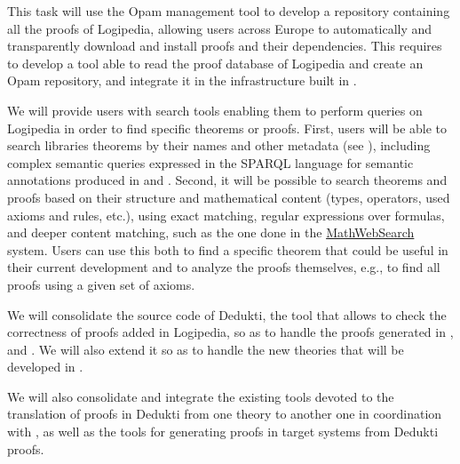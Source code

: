 \begin{workpackage}[id=access,type=RTD,wphases=1-48,
  short=Access,%
  title={Access},
  lead=Inr,InrRM=48,OcaRM=6,EduRM=12]
\begin{tasklist}
\begin{task}[id=opam,
      title=Giving access to the infrastructure in proof systems,
      lead=Oca,OcaRM=6,wphases=15-24]
    This task will use the Opam management tool to develop a
    repository containing all the proofs of Logipedia, allowing users
    across Europe to automatically and transparently download and
    install proofs and their dependencies. This
    requires to develop a tool able to read the proof
    database of Logipedia and create an Opam repository,
    and integrate it in the infrastructure built in .
  \end{task}

  \begin{task}[id=search,
      title=Providing search tools,
      lead=Inr,InrRM=18,wphases=15-33]
    We will provide users with search tools enabling them to perform
    queries on Logipedia in order to find specific theorems or proofs.
    First, users will be able to search libraries theorems by their
    names and other metadata (see ),
    including complex semantic queries expressed in the SPARQL
    language for semantic annotations produced in
     and
    . Second, it will be possible to
    search theorems and proofs based on their structure and
    mathematical content (types, operators, used axioms and rules,
    etc.), using exact matching, regular expressions over formulas, and
    deeper content matching, such as the one done in the
    \hyperlink{https://kwarc.info/systems/mws/}{MathWebSearch}
    system. Users can use this both to find a specific theorem that
    could be useful in their current development and to analyze the
    proofs themselves, e.g., to find all proofs using a given set of
    axioms. 
  \end{task}

  \begin{task}[id=dedukti,
      title=Development of Dedukti checking and translation tools,
      lead=Inr,InrRM=18,wphases=13-36] We will consolidate the source
    code of Dedukti, the tool that allows to check the correctness of
    proofs added in Logipedia, so as to handle the proofs generated in
    ,  and . We
    will also extend it so as to handle the new theories that will be
    developed in .

    We will also consolidate and integrate the existing tools devoted
    to the translation of proofs in Dedukti from one theory to another
    one in coordination with , as well as the tools
    for generating proofs in target systems from Dedukti proofs.
    

\end{task}
\end{tasklist}
\end{workpackage}
